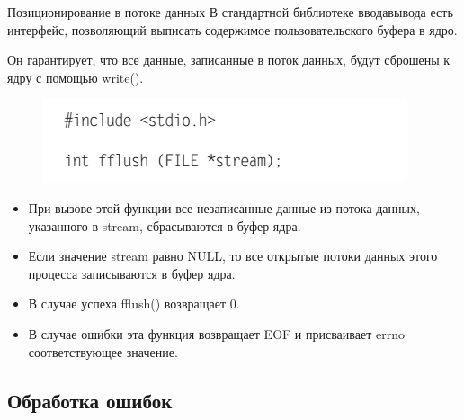 \documentclass{beamer}
\begin{document}
\begin{frame}{Позиционирование в потоке данных}
В стандартной библиотеке ввода­вывода есть интерфейс, позволяющий выписать
содержимое пользовательского буфера в ядро. 

Он гарантирует, что все данные, записанные в поток данных, будут сброшены к ядру с помощью write().
\begin{figure}[h]
\centering
\includegraphics[scale=0.6]{images/lec05-pic24.png}
\end{figure}
\begin{itemize}
\item При вызове этой функции все незаписанные данные из потока данных, указанного в stream, сбрасываются в буфер ядра. 
\item Если значение stream равно NULL, то все открытые потоки данных этого процесса записываются в буфер ядра. 
\item В случае успеха fflush() возвращает 0. 
\item В случае ошибки эта функция возвращает EOF и присваивает errno соответствующее значение.
\end{itemize}
\end{frame}

\subsection{Обработка ошибок}
\end{document}
